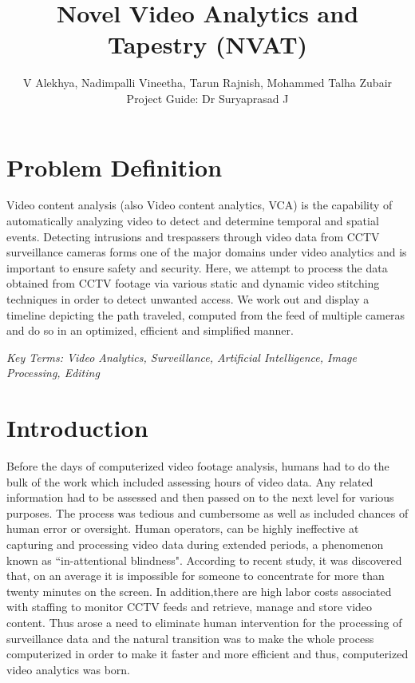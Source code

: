 \documentclass[12pt]{article}
\begin{document}
\title{Novel Video Analytics and Tapestry (NVAT)}
\color{black}
\author{ V Alekhya, Nadimpalli Vineetha, Tarun Rajnish, Mohammed Talha Zubair \\Project Guide: Dr Suryaprasad J}
\maketitle

\noindent
\section{Problem Definition}
Video content analysis (also Video content analytics, VCA) is the capability of automatically analyzing video to detect and determine temporal and spatial events. Detecting intrusions and trespassers through video data from CCTV surveillance cameras forms one of the major domains under video analytics and is important to ensure safety and security.
Here, we attempt to process the data obtained from CCTV footage via various static and dynamic video stitching techniques in order to detect unwanted access. We work out and display a timeline depicting the path traveled, computed from the feed of multiple cameras and do so in an optimized, efficient and simplified manner.
\newline

\textit{Key Terms: Video Analytics, Surveillance, Artificial Intelligence, Image Processing, Editing}

\section{Introduction}

Before the days of computerized video footage analysis, humans had to do the bulk of the work which included assessing hours of video data. Any related information had to be assessed and then passed on to the next level for various purposes. The process was tedious and cumbersome as well as included chances of human error or oversight. Human operators, can be highly ineffective at capturing and processing video data during extended periods, a phenomenon known as “in-attentional blindness". According to recent study, it was discovered that, on an average it is impossible for someone to concentrate for more than twenty minutes on the screen. In addition,there are high labor costs associated with staffing to monitor CCTV feeds and retrieve, manage and store video content. Thus arose a need to eliminate human intervention for the processing of surveillance data and the natural transition was to make the whole process computerized in order to make it faster and more efficient and thus, computerized video analytics was born.
\newline
\end{document}
